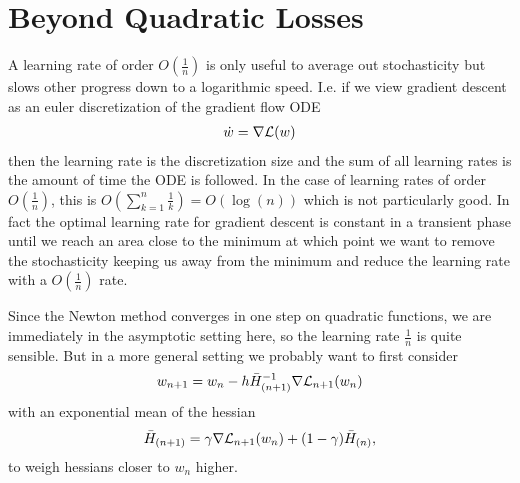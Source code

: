 \section{Beyond Quadratic Losses}

A learning rate of order \(O(\frac1n)\) is only useful to average out
stochasticity but slows other progress down to a logarithmic speed. I.e.
if we view gradient descent as an euler discretization of the gradient flow
ODE
\begin{align*}
	\dot{w} = \nabla\mathcal{L}(w)
\end{align*}
then the learning rate is the discretization size and the sum of all learning
rates is the amount of time the ODE is followed. In the case of learning
rates of order \(O(\frac1n)\), this is \(O\left(\sum_{k=1}^n \frac1k\right) =
O(\log(n))\) which is not particularly good. In fact the optimal learning
rate for gradient descent is constant in a transient phase until we reach an
area close to the minimum at which point we want to remove the stochasticity
keeping us away from the minimum and reduce the learning rate with a
\(O(\frac1n)\) rate.

Since the Newton method converges in one step on quadratic functions, we are
immediately in the asymptotic setting here, so the learning rate \(\frac1n\)
is quite sensible. But in a more general setting we probably want to first
consider
\begin{align*}
	w_{n+1} = w_n - h \bar{H}_{(n+1)}^{-1} \nabla\mathcal{L}_{n+1}(w_n)
\end{align*}
with an exponential mean of the hessian
\begin{align*}
	\bar{H}_{(n+1)} = \gamma \nabla\mathcal{L}_{n+1}(w_n) + (1-\gamma)\bar{H}_{(n)},
\end{align*}
to weigh hessians closer to \(w_n\) higher.
